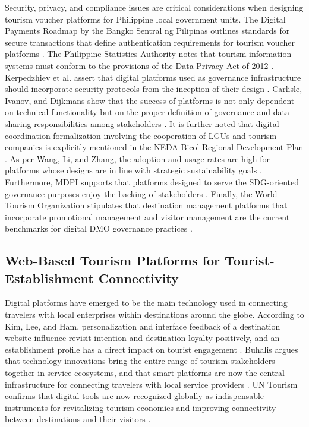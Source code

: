 \documentclass{research}
\begin{document}
Security, privacy, and compliance issues are critical considerations when designing tourism voucher platforms for Philippine local government units. The Digital Payments Roadmap by the Bangko Sentral ng Pilipinas outlines standards for secure transactions that define authentication requirements for tourism voucher platforms \cite{bsp2024}. The Philippine Statistics Authority notes that tourism information systems must conform to the provisions of the Data Privacy Act of 2012 \cite{psa2025}. Kerpedzhiev et al. assert that digital platforms used as governance infrastructure should incorporate security protocols from the inception of their design \cite{kerpedzhiev2021}. Carlisle, Ivanov, and Dijkmans show that the success of platforms is not only dependent on technical functionality but on the proper definition of governance and data-sharing responsibilities among stakeholders \cite{carlisle2021}. It is further noted that digital coordination formalization involving the cooperation of LGUs and tourism companies is explicitly mentioned in the NEDA Bicol Regional Development Plan \cite{neda2023}. As per Wang, Li, and Zhang, the adoption and usage rates are high for platforms whose designs are in line with strategic sustainability goals \cite{wang2024}. Furthermore, MDPI supports that platforms designed to serve the SDG-oriented governance purposes enjoy the backing of stakeholders \cite{mdpi2025}. Finally, the World Tourism Organization stipulates that destination management platforms that incorporate promotional management and visitor management are the current benchmarks for digital DMO governance practices \cite{unwto2023}.

\subsection{Web-Based Tourism Platforms for Tourist-Establishment Connectivity}

Digital platforms have emerged to be the main technology used in connecting travelers with local enterprises within destinations around the globe. According to Kim, Lee, and Ham, personalization and interface feedback of a destination website influence revisit intention and destination loyalty positively, and an establishment profile has a direct impact on tourist engagement \cite{kim2023}. Buhalis argues that technology innovations bring the entire range of tourism stakeholders together in service ecosystems, and that smart platforms are now the central infrastructure for connecting travelers with local service providers \cite{buhalis2020}. UN Tourism confirms that digital tools are now recognized globally as indispensable instruments for revitalizing tourism economies and improving connectivity between destinations and their visitors \cite{untourism2024}.
\end{document}

